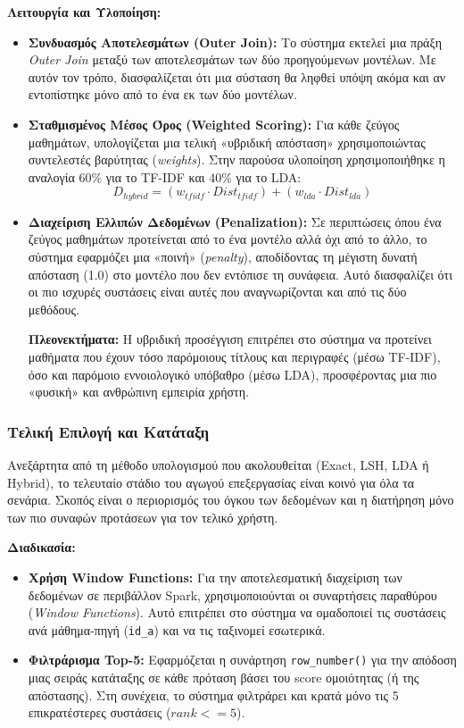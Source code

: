\documentclass[a4paper,12pt]{article}
\begin{document}
\textbf{Λειτουργία και Υλοποίηση:} 
\begin{itemize} 
    \item \textbf{Συνδυασμός Αποτελεσμάτων (Outer Join):} Το σύστημα εκτελεί μια πράξη \textit{Outer Join} μεταξύ των αποτελεσμάτων των δύο προηγούμενων μοντέλων. Με αυτόν τον τρόπο, διασφαλίζεται ότι μια σύσταση θα ληφθεί υπόψη ακόμα και αν εντοπίστηκε μόνο από το ένα εκ των δύο μοντέλων.

    \item \textbf{Σταθμισμένος Μέσος Όρος (Weighted Scoring):} Για κάθε ζεύγος μαθημάτων, υπολογίζεται μια τελική «υβριδική απόσταση» χρησιμοποιώντας συντελεστές βαρύτητας (\textit{weights}). Στην παρούσα υλοποίηση χρησιμοποιήθηκε η αναλογία 60\% για το TF-IDF και 40\% για το LDA:
    \begin{equation}
        D_{hybrid} = (w_{tfidf} \cdot Dist_{tfidf}) + (w_{lda} \cdot Dist_{lda})
    \end{equation}
    
    \item \textbf{Διαχείριση Ελλιπών Δεδομένων (Penalization):} Σε περιπτώσεις όπου ένα ζεύγος μαθημάτων προτείνεται από το ένα μοντέλο αλλά όχι από το άλλο, το σύστημα εφαρμόζει μια «ποινή» (\textit{penalty}), αποδίδοντας τη μέγιστη δυνατή απόσταση (1.0) στο μοντέλο που δεν εντόπισε τη συνάφεια. Αυτό διασφαλίζει ότι οι πιο ισχυρές συστάσεις είναι αυτές που αναγνωρίζονται και από τις δύο μεθόδους.

    \textbf{Πλεονεκτήματα:} Η υβριδική προσέγγιση επιτρέπει στο σύστημα να προτείνει μαθήματα που έχουν τόσο παρόμοιους τίτλους και περιγραφές (μέσω TF-IDF), όσο και παρόμοιο εννοιολογικό υπόβαθρο (μέσω LDA), προσφέροντας μια πιο «φυσική» και ανθρώπινη εμπειρία χρήστη.
\end{itemize}

\subsubsection{Τελική Επιλογή και Κατάταξη} 
Ανεξάρτητα από τη μέθοδο υπολογισμού που ακολουθείται (Exact, LSH, LDA ή Hybrid), το τελευταίο στάδιο του αγωγού επεξεργασίας είναι κοινό για όλα τα σενάρια. Σκοπός είναι ο περιορισμός του όγκου των δεδομένων και η διατήρηση μόνο των πιο συναφών προτάσεων για τον τελικό χρήστη.

\textbf{Διαδικασία:} 
\begin{itemize} 
    \item \textbf{Χρήση Window Functions:} Για την αποτελεσματική διαχείριση των δεδομένων σε περιβάλλον Spark, χρησιμοποιούνται οι συναρτήσεις παραθύρου (\textit{Window Functions}). Αυτό επιτρέπει στο σύστημα να ομαδοποιεί τις συστάσεις ανά μάθημα-πηγή (\texttt{id\_a}) και να τις ταξινομεί εσωτερικά. 
    
    \item \textbf{Φιλτράρισμα Top-5:} Εφαρμόζεται η συνάρτηση \texttt{row\_number()} για την απόδοση μιας σειράς κατάταξης σε κάθε πρόταση βάσει του score ομοιότητας (ή της απόστασης). Στη συνέχεια, το σύστημα φιλτράρει και κρατά μόνο τις 5 επικρατέστερες συστάσεις (\texttt{$rank <= 5$}). \end{itemize}
\end{document}
